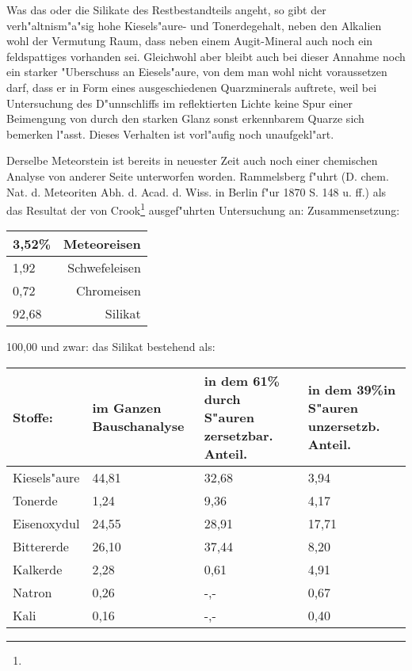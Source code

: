 \documentclass[a4paper, 11pt, oneside]{article}
\begin{document}
Was das oder die Silikate des Restbestandteils angeht, so gibt der verh"altnism"a"sig hohe Kiesels"aure- und Tonerdegehalt, neben den Alkalien wohl der Vermutung Raum, dass neben einem Augit-Mineral auch noch ein feldspattiges vorhanden sei. Gleichwohl aber bleibt auch bei dieser Annahme noch ein starker "Uberschuss an Eiesels"aure, von dem man wohl nicht voraussetzen darf, dass er in Form eines ausgeschiedenen Quarzminerals auftrete, weil bei Untersuchung des D"unnschliffs im reflektierten Lichte keine Spur einer Beimengung von durch den starken Glanz sonst erkennbarem Quarze sich bemerken l"asst. Dieses Verhalten ist vorl"aufig noch unaufgekl"art.

Derselbe Meteorstein ist bereits in neuester Zeit auch noch einer chemischen Analyse von anderer Seite unterworfen worden. Rammelsberg f"uhrt (D. chem. Nat. d. Meteoriten Abh. d. Acad. d. Wiss. in Berlin f"ur 1870 S. 148 u. ff.) als das Resultat der von Crook\footnote{} ausgef"uhrten Untersuchung an: Zusammensetzung:
\begin{center}
    \begin{tabular}{ |l|r| } 
    \hline
    3,52\% & Meteoreisen\\\hline
    1,92 & Schwefeleisen\\\hline
    0,72 & Chromeisen\\\hline
    92,68 & Silikat\\
    \hline
    \end{tabular}
\end{center}
100,00 und zwar:
das Silikat bestehend als:
\begin{center}
\begin{tabular}{ |p{20mm}|p{24mm}|p{31mm}|p{32mm}| }
    \hline
    Stoffe: & im Ganzen Bauschanalyse & in dem 61\% durch S"auren zersetzbar. Anteil. & in dem 39\%\newline in S"auren unzersetzb. Anteil.\\
    \hline\hline
    Kiesels"aure & 44,81 & 32,68 & 3,94\\\hline
    Tonerde & 1,24 & 9,36 & 4,17\\\hline
    Eisenoxydul & 24,55 & 28,91 & 17,71\\\hline
    Bittererde & 26,10 & 37,44 & 8,20\\\hline
    Kalkerde & 2,28 & 0,61 & 4,91\\\hline
    Natron & 0,26 & -,- & 0,67\\\hline
    Kali & 0,16 & -,- & 0,40\\
    \hline
\end{tabular}
\end{center}
\end{document}
